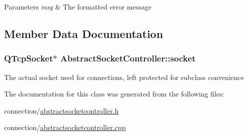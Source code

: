 \begin{DoxyParams}{Parameters}
{\em msg} & The formatted error message \\
\hline
\end{DoxyParams}


\subsection{Member Data Documentation}
\hypertarget{classAbstractSocketController_aa979beef2f78be052f3e7f3255cdc644}{
\subsubsection[{socket}]{\setlength{\rightskip}{0pt plus 5cm}QTcpSocket$\ast$ {\bf AbstractSocketController::socket}}}
\label{classAbstractSocketController_aa979beef2f78be052f3e7f3255cdc644}
The actual socket used for connections, left protected for subclass convenience 

The documentation for this class was generated from the following files:\begin{DoxyCompactItemize}
\item 
connection/\hyperlink{abstractsocketcontroller_8h}{abstractsocketcontroller.h}\item 
connection/\hyperlink{abstractsocketcontroller_8cpp}{abstractsocketcontroller.cpp}\end{DoxyCompactItemize}
